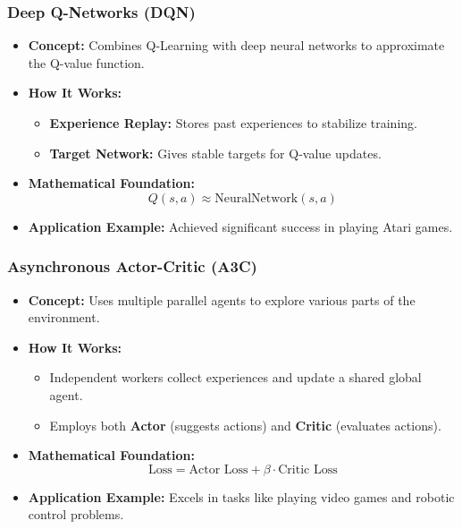 \documentclass{beamer}
\begin{document}
\begin{frame}[fragile]
    \frametitle{Deep Q-Networks (DQN)}
    \begin{itemize}
        \item \textbf{Concept:} Combines Q-Learning with deep neural networks to approximate the Q-value function.
        \item \textbf{How It Works:}
        \begin{itemize}
            \item \textbf{Experience Replay:} Stores past experiences to stabilize training.
            \item \textbf{Target Network:} Gives stable targets for Q-value updates.
        \end{itemize}
        \item \textbf{Mathematical Foundation:}
        \begin{equation}
            Q(s, a) \approx \text{NeuralNetwork}(s, a)
        \end{equation}
        \item \textbf{Application Example:} Achieved significant success in playing Atari games.
    \end{itemize}
\end{frame}

\begin{frame}[fragile]
    \frametitle{Asynchronous Actor-Critic (A3C)}
    \begin{itemize}
        \item \textbf{Concept:} Uses multiple parallel agents to explore various parts of the environment.
        \item \textbf{How It Works:}
        \begin{itemize}
            \item Independent workers collect experiences and update a shared global agent.
            \item Employs both \textbf{Actor} (suggests actions) and \textbf{Critic} (evaluates actions).
        \end{itemize}
        \item \textbf{Mathematical Foundation:}
        \begin{equation}
            \text{Loss} = \text{Actor Loss} + \beta \cdot \text{Critic Loss}
        \end{equation}
        \item \textbf{Application Example:} Excels in tasks like playing video games and robotic control problems.
    \end{itemize}
\end{frame}
\end{document}
